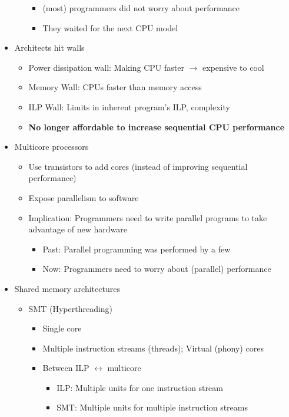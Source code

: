 \documentclass[a4paper]{article}
\begin{document}
\begin{itemize}
\begin{itemize}
\begin{itemize}
\item (most) programmers did not worry about performance
\item They waited for the next CPU model
\end{itemize}
\end{itemize}
\item Architects hit walls 
\begin{itemize}
\item Power dissipation wall: Making CPU faster $\to$ expensive to cool
\item Memory Wall: CPUs faster than memory access
\item ILP Wall: Limits in inherent program's ILP, complexity
\item \textbf{No longer affordable to increase sequential CPU performance}
\end{itemize}
\item Multicore processors
\begin{itemize}
\item Use transistors to add cores (instead of improving sequential performance)
\item Expose parallelism to software
\item Implication: Programmers need to write parallel programs to take advantage of new hardware
\begin{itemize}
\item Past: Parallel programming was performed by a few
\item Now: Programmers need to worry about (parallel) performance
\end{itemize}
\end{itemize}
\item Shared memory architectures 
\begin{itemize}
\item SMT (Hyperthreading)
\begin{itemize}
\item Single core
\item Multiple instruction streams (threads); Virtual (phony) cores
\item Between ILP $\leftrightarrow$ multicore
\begin{itemize}
\item ILP: Multiple units for one instruction stream
\item SMT: Multiple units for multiple instruction streams

\end{itemize}
\end{itemize}
\end{itemize}
\end{itemize}
\end{document}
